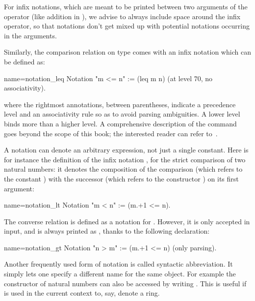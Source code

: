 For infix notations, which are meant to be printed between two arguments
of the operator (like addition in ), we advise to always include
space around the infix operator, so that notations don't get mixed up with
potential notations occurring in the arguments.


Similarly, the comparison relation  on type  comes with
an infix notation \C{<=} which can be defined as:

\begin{coq}{name=notation_leq}{}
Notation "m <= n" := (leq m n) (at level 70, no associativity).
\end{coq}

where the rightmost annotations, between parentheses, indicate a
precedence level and an associativity rule so as to avoid parsing
ambiguities. A lower level binds more than a higher level. A comprehensive
description of the  command goes beyond the scope of this
book; the interested reader can refer to~\cite[``Syntax extensions and interpretation scopes'']{Coq:manual}.

A notation can denote an arbitrary expression, not just a
single constant. Here is for instance the definition of the infix
notation \C{<}, for the strict comparison of two natural numbers: it
denotes the composition of the comparison \C{_ <= _}
(which refers to the constant ) with the successor 
(which refers to the constructor ) on its first argument:

\begin{coq}{name=notation_lt}{}
Notation "m < n"  := (m.+1 <= n).
\end{coq}


The converse relation  is defined as a notation for
. However, it is only accepted in input,
and is always printed as  , thanks to the following declaration:

\begin{coq}{name=notation_gt}{}
Notation "n > m"  := (m.+1 <= n) (only parsing).
\end{coq}

Another frequently used form of notation is called syntactic abbreviation.
It simply lets one specify a different name for the same object.
For example the  constructor of natural numbers can also be accessed
by writing .  This is useful if  is used in the current context
to, say, denote a ring.

